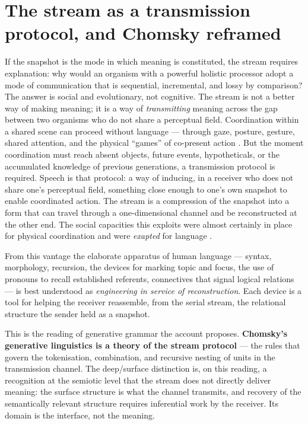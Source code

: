 \documentclass{article}
\begin{document}
\section{The stream as a transmission protocol, and Chomsky reframed}\label{sec:chomsky}

If the snapshot is the mode in which meaning is constituted, the stream requires explanation: why would an organism with a powerful holistic processor adopt a mode of communication that is sequential, incremental, and lossy by comparison? The answer is social and evolutionary, not cognitive. The stream is not a better way of making meaning; it is a way of \emph{transmitting} meaning across the gap between two organisms who do not share a perceptual field. Coordination within a shared scene can proceed without language --- through gaze, posture, gesture, shared attention, and the physical ``games'' of co-present action \citep{Bates1975Performatives,Tomasello2005Understanding}. But the moment coordination must reach absent objects, future events, hypotheticals, or the accumulated knowledge of previous generations, a transmission protocol is required. Speech is that protocol: a way of inducing, in a receiver who does not share one's perceptual field, something close enough to one's own snapshot to enable coordinated action. The stream is a compression of the snapshot into a form that can travel through a one-dimensional channel and be reconstructed at the other end. The social capacities this exploits were almost certainly in place for physical coordination and were \emph{exapted} for language \citep{GouldVrba1982Exaptation}.

From this vantage the elaborate apparatus of human language --- syntax, morphology, recursion, the devices for marking topic and focus, the use of pronouns to recall established referents, connectives that signal logical relations --- is best understood as \emph{engineering in service of reconstruction}. Each device is a tool for helping the receiver reassemble, from the serial stream, the relational structure the sender held as a snapshot.

This is the reading of generative grammar the account proposes. \textbf{Chomsky's generative linguistics is a theory of the stream protocol} --- the rules that govern the tokenisation, combination, and recursive nesting of units in the transmission channel. The deep/surface distinction is, on this reading, a recognition at the semiotic level that the stream does not directly deliver meaning: the surface structure is what the channel transmits, and recovery of the semantically relevant structure requires inferential work by the receiver. Its domain is the interface, not the meaning.
\end{document}
